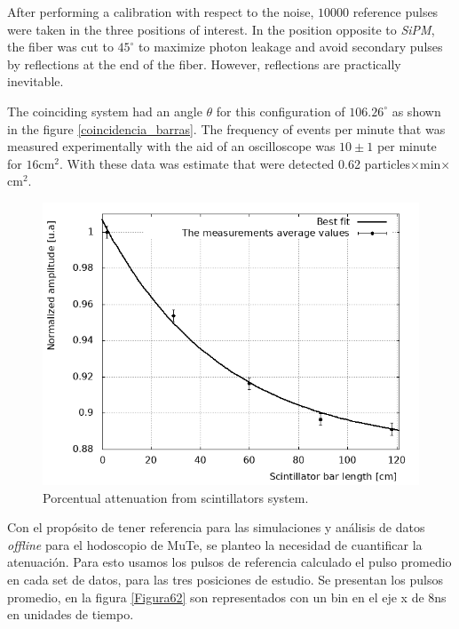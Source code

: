 \documentclass[submitting]{nst}
\begin{document}
After performing a calibration with respect to the noise, $10000$ reference pulses were taken in the three positions of interest. In the position opposite to \textsl{SiPM}, the fiber was cut to $45^{\circ}$ to maximize photon leakage and avoid secondary pulses by reflections at the end of the fiber. However, reflections are practically inevitable.

The coinciding system had an angle $\theta$ for this configuration of $106.26^{\circ}$ as shown in the figure \ref{coincidencia_barras}. The frequency of events per minute that was measured experimentally with the aid of an oscilloscope was $10\pm1$ per minute for $16$cm$^2$. With these data was estimate that were detected 0.62 particles$\times$min$\times$cm$^2$. 



\begin{figure}[h!] %
    \centering
        \includegraphics[scale=0.49]{Figures/atenuacion_esperimental.png}
   \caption{Porcentual attenuation from scintillators system.} \label{experimental attenuation}
\end{figure}


Con el propósito de tener referencia para las simulaciones y análisis de datos \textit{offline} para el hodoscopio de MuTe, se planteo la necesidad de cuantificar la atenuación. Para esto usamos los pulsos de referencia calculado el pulso promedio en cada set de datos, para las tres posiciones de estudio. Se presentan los pulsos promedio, en la figura \ref{Figura62} son representados con un bin en el eje x de 8ns en  unidades de tiempo.
\end{document}
